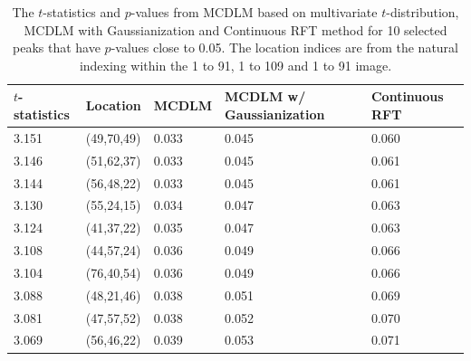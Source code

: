 \documentclass{article}
\begin{document}
\begin{table}[!htp]
\caption{The $t$-statistics and $p$-values from MCDLM based on multivariate $t$-distribution, MCDLM with Gaussianization and Continuous RFT method for 10 selected peaks that have $p$-values close to 0.05. The location indices are from the natural indexing within the 1 to 91, 1 to 109 and 1 to 91 image. \label{tab.hcp}}
\centering
\begin{tabular}{lllll}
\hline
$t$-statistics & Location & MCDLM & MCDLM w/ Gaussianization & Continuous RFT\\ \hline
3.151 & (49,70,49) & 0.033 & 0.045 & 0.060 \\ 
3.146 & (51,62,37) & 0.033 & 0.045 & 0.061 \\ 
3.144 & (56,48,22) & 0.033 & 0.045 & 0.061 \\ 
3.130 & (55,24,15) & 0.034 & 0.047 & 0.063 \\ 
3.124 & (41,37,22) & 0.035 & 0.047 & 0.063 \\ 
3.108 & (44,57,24) & 0.036 & 0.049 & 0.066 \\ 
3.104 & (76,40,54) & 0.036 & 0.049 & 0.066 \\ 
3.088 & (48,21,46) & 0.038 & 0.051 & 0.069 \\ 
3.081 & (47,57,52) & 0.038 & 0.052 & 0.070 \\ 
3.069 & (56,46,22) & 0.039 & 0.053 & 0.071 \\ \hline
\end{tabular}
\end{table}
\end{document}
